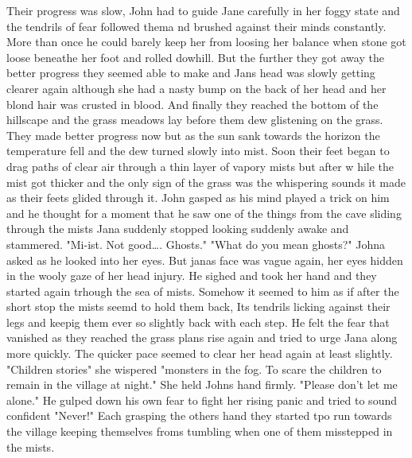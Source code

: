 Their progress was slow, John had to guide Jane carefully in her foggy state and the tendrils of fear followed thema nd brushed against their minds constantly. More than once he could barely keep her from loosing her balance when stone got loose beneathe her foot and rolled dowhill.  But the further they got away the better progress they seemed able to make and Jans head was slowly getting clearer again although she had a nasty bump on the back of her head and her blond hair was crusted in blood. And finally they reached the bottom of the hillscape and the grass meadows lay before them dew glistening on the grass. They made better progress now but as the sun sank towards the horizon the temperature fell and the dew turned slowly into mist. Soon their feet began to drag paths of clear air through a thin layer of vapory mists but after w hile the mist got thicker and the only sign of the grass was the whispering sounds it made as their feets glided through it. John gasped as his mind played a trick on him and he thought for a moment that he saw one of the things from the cave sliding through the mists Jana suddenly stopped looking suddenly awake  and stammered. "Mi-ist. Not good\dots. Ghosts." "What do you mean ghosts?" Johna asked as he looked into her eyes. But janas face was vague again, her eyes hidden in the wooly gaze of her head injury. He sighed and took her hand and they started again trhough the sea of mists. Somehow it seemed to him as if after the short stop the mists seemd to hold them back, Its tendrils licking against their legs and keepig them ever so slightly back with each step. He felt the fear that vanished as they reached the grass plans rise again and tried to urge Jana along more quickly. The quicker pace seemed to clear her head again at least slightly. "Children stories" she wispered "monsters in the fog. To scare the children to remain in the village at night." She held Johns hand firmly. "Please don't let me alone." He gulped down his own fear to fight her rising panic and tried to sound confident "Never!" Each grasping the others hand they started tpo run towards the village keeping themselves froms tumbling when one of them misstepped in the mists.
